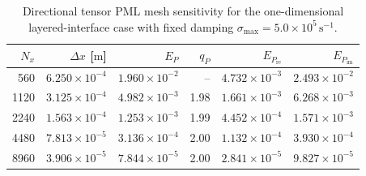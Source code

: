 \begin{table}[H]
    \centering
    \caption{Directional tensor PML mesh sensitivity for the one-dimensional layered-interface case with fixed damping $\sigma_{\max}=5.0\times10^5\,\mathrm{s^{-1}}$.}
    \label{tab:pmlMeshSensitivity}
    \begin{tabular}{rrrrrr}
        \toprule
        $N_x$ & $\Delta x$ [$\mathrm{m}$] & $E_P$ & $q_P$ & $E_{P_{\mathrm{re}}}$ & $E_{P_{\mathrm{im}}}$ \\
        \midrule
        560 & $6.250\times 10^{-4}$ & $1.960\times 10^{-2}$ & -- & $4.732\times 10^{-3}$ & $2.493\times 10^{-2}$ \\
        1120 & $3.125\times 10^{-4}$ & $4.982\times 10^{-3}$ & 1.98 & $1.661\times 10^{-3}$ & $6.268\times 10^{-3}$ \\
        2240 & $1.563\times 10^{-4}$ & $1.253\times 10^{-3}$ & 1.99 & $4.452\times 10^{-4}$ & $1.571\times 10^{-3}$ \\
        4480 & $7.813\times 10^{-5}$ & $3.136\times 10^{-4}$ & 2.00 & $1.132\times 10^{-4}$ & $3.930\times 10^{-4}$ \\
        8960 & $3.906\times 10^{-5}$ & $7.844\times 10^{-5}$ & 2.00 & $2.841\times 10^{-5}$ & $9.827\times 10^{-5}$ \\
        \bottomrule
    \end{tabular}
\end{table}
